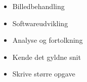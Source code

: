 \begin{itemize}
	\item Billedbehandling
	\item Softwareudvikling
	\item Analyse og fortolkning
	\item Kende det gyldne snit
	\item Skrive større opgave
\end{itemize}
